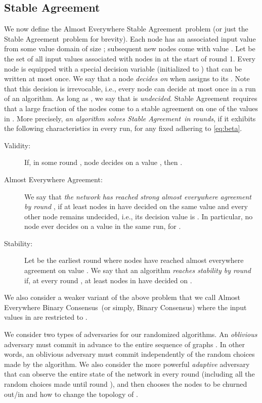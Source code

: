 \documentclass[leqno,11pt]{article}
\newcommand{\sa}{{\sc Stable Agreement}}
\newcommand{\bc}{{\sc Binary Consensus}}
\begin{document}
\subsection{Stable Agreement} \label{sec:sa}
We now define the {\sc Almost Everywhere} \sa\ problem (or just the \sa\ problem for brevity). Each node  has an associated input
value from some value domain of size ; subsequent new nodes come with value . 
Let  be the set of all input values associated with nodes in  at the start of round
1. Every node  is equipped with a special decision variable  (initialized to ) that can be written at
most once. We say that a node  \emph{decides on } when  assigns  to its . Note that this decision is
irrevocable, i.e., every node can decide at most once in a run of an algorithm. As long as , we say that  is {\em undecided}.
\sa\ requires that a large fraction of the nodes come to a stable
agreement on one of the values in . More precisely, \emph{an algorithm solves
\sa\ in  rounds}, if it exhibits the following characteristics in every run,
for any fixed  adhering to \eqref{eq:beta}.
\begin{description}
\item[Validity:] If, in some round , node  decides on a value
  , then . 
\item[Almost Everywhere Agreement:] We say that \emph{the network has
  reached strong almost everywhere agreement by round }, if at least  nodes in  have decided on the same value  and every
  other node remains undecided, i.e., its decision value is . In particular, no
  node ever decides on a value  in the same run, for .
\item[Stability:] Let  be the earliest round where nodes have reached almost
  everywhere agreement on value . We say that an algorithm \emph{reaches stability by round } if, at every
  round , at least  nodes in  have decided on
  .
\end{description}
We also consider a weaker variant of the above problem that we call 
{\sc Almost Everywhere} \bc\ (or simply, \bc) where
the input values in  are restricted to .


We consider two types of adversaries for our randomized algorithms. An
\emph{oblivious} adversary  must commit in advance to the entire sequence of
graphs . In other
words, an oblivious adversary must commit independently of the random choices
made by the algorithm. 
We also consider the more powerful
  \emph{adaptive} adversary that can observe the entire state of the network in
  every round  (including all the random choices made until  round ), and then chooses the nodes to be churned out/in and how to
  change the topology of .
\end{document}
